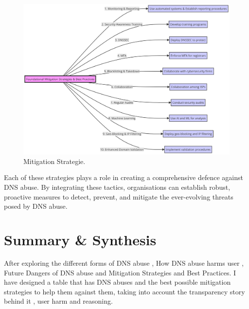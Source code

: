 \captionsetup{font= footnotesize}
\begin{figure} [H]
    \centering
   \includegraphics[width=1.1\textwidth]{background/diagram (7).png}
    \caption{Mitigation Strategie.}
    \label{sadasdasdada}
\end{figure}

Each of these strategies plays a role in creating a comprehensive defence against DNS abuse. By integrating these tactics, organisations can establish robust, proactive measures to detect, prevent, and mitigate the ever-evolving threats posed by DNS abuse.

\section{Summary \& Synthesis}

After exploring the different forms of DNS abuse , How DNS abuse harms user , Future Dangers of DNS abuse and Mitigation Strategies and Best Practices. I have designed a table that has DNS abuses and the best possible mitigation strategies to help them against them, taking into account the transparency story behind it , user harm and reasoning. 


